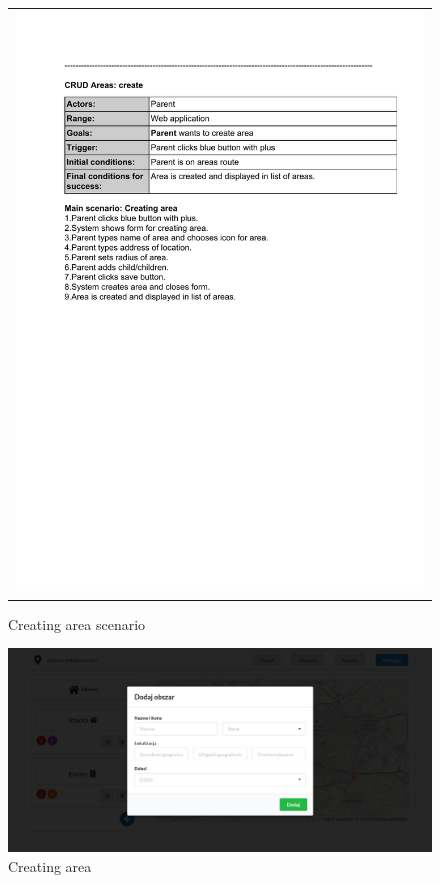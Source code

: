 \documentclass{sprawozdanie-agh}
\begin{document}
		\begin{figure}[H] 
			\centering
			\begin{tabular}{c}
				\includegraphics[width=.80\textwidth]{crA_cropped} 
			\end{tabular} 
		\caption{Creating area scenario}
		\end{figure}

		\begin{figure}[H]
			\centering
			\includegraphics[width=.80\textwidth]{addArea}
			\caption{Creating area}
		\end{figure}
\end{document}
